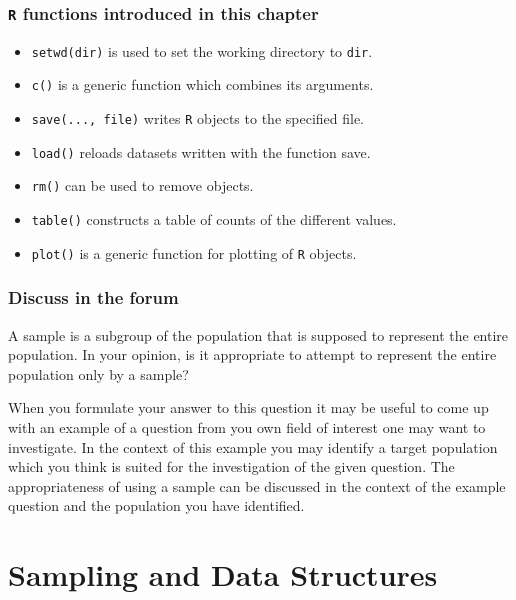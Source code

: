 \documentclass[
]{krantz}
\theoremstyle{definition}
\theoremstyle{definition}
\theoremstyle{definition}
\theoremstyle{remark}
\begin{document}
\hypertarget{r-funcs}{%
\subsection*{\texorpdfstring{\texttt{R} functions introduced in this chapter}{R functions introduced in this chapter}}\label{r-funcs}}


\begin{itemize}
\item
  \texttt{setwd(dir)} is used to set the working directory to \texttt{dir}.
\item
  \texttt{c()} is a generic function which combines its arguments.
\item
  \texttt{save(...,\ file)} writes \texttt{R} objects to the specified file.
\item
  \texttt{load()} reloads datasets written with the function save.
\item
  \texttt{rm()} can be used to remove objects.
\item
  \texttt{table()} constructs a table of counts of the different values.
\item
  \texttt{plot()} is a generic function for plotting of \texttt{R} objects.
\end{itemize}

\hypertarget{discuss-in-the-forum}{%
\subsection*{Discuss in the forum}\label{discuss-in-the-forum}}


A sample is a subgroup of the population that is supposed to represent the entire population. In your opinion, is it appropriate to attempt to represent the entire population only by a sample?

When you formulate your answer to this question it may be useful to come up with an example of a question from you own field of interest one may want to investigate. In the context of this example you may identify a target population which you think is suited for the investigation of the given question. The appropriateness of using a sample can be discussed in the context of the example question and the population you have identified.

\hypertarget{ChapData}{%
\chapter{Sampling and Data Structures}\label{ChapData}}
\end{document}
